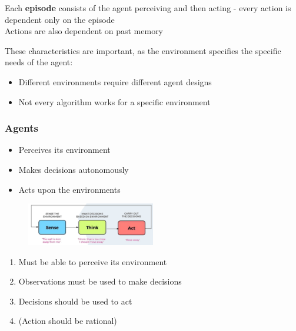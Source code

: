 \documentclass[
../../EiKI_Summary.tex,
]
{subfiles}
\begin{document}
\begin{defbox}
     Each \textbf{episode} consists of the agent perceiving and then acting -  every action is dependent only on the episode\\
     Actions are also dependent on past memory
\end{defbox}

These characteristics are important, as the environment specifies the specific needs of the agent: 
\begin{itemize}
    \item Different environments require different agent designs
    \item Not every algorithm works for a specific environment
\end{itemize} 

\subsubsection{Agents}
\begin{itemize}
    \item {} Perceives its environment
    \item {} Makes decisions autonomously
    \item {} Acts upon the environments
\end{itemize}

\begin{figure}
    [htp]
    \centering
    \includegraphics[width=0.5\textwidth]{Pics/Agent.png}
\end{figure}

\begin{defbox}
    \begin{enumerate}
        \item Must be able to perceive its environment
        \item Observations must be used to make decisions
        \item Decisions should be used to act
        \item (Action should be rational)
    \end{enumerate}
\end{defbox}
\end{document}
